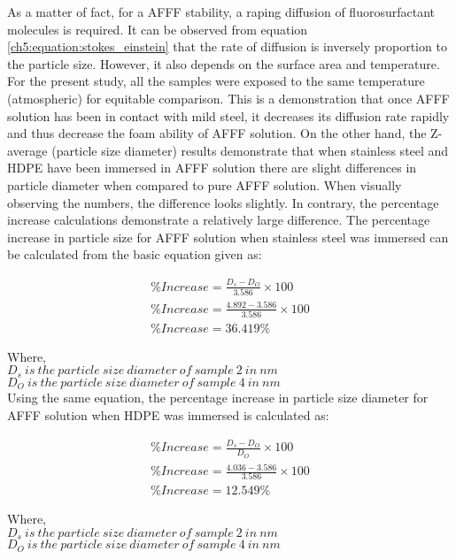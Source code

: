 As a matter of fact, for a AFFF stability, a raping diffusion of fluorosurfactant molecules is required. It can be observed from equation \ref{ch5:equation:stokes_einstein} that the rate of diffusion is inversely proportion to the particle size. However, it also depends on the surface area and temperature. For the present study, all the samples were exposed to the same temperature (atmospheric) for equitable comparison. This is a demonstration that once AFFF solution has been in contact with mild steel, it decreases its diffusion rate rapidly and thus decrease the foam ability of AFFF solution.  On the other hand, the Z-average (particle size diameter) results demonstrate that when stainless steel and HDPE have been immersed in AFFF solution there are slight differences in particle diameter when compared to pure AFFF solution. When visually observing the numbers, the difference looks slightly. In contrary, the percentage increase calculations demonstrate a relatively large difference. The percentage increase in particle size for AFFF solution when stainless steel was immersed can be calculated from the basic equation given as: 

\begin{gather}
    \%Increase = \frac{D_s - D_O}{3.586} \times 100 \\ 
    \nonumber \%Increase = \frac{4.892 - 3.586}{3.586}\times 100 \\
    \nonumber \%Increase = 36.419\%
    \label{ch5:equation:stainless_steel}
\end{gather}

Where, \\
$D_s\ is\ the\ particle\ size\ diameter\ of\ sample\ 2\ in\ nm$ \\
$D_O\ is\ the\ particle\ size\ diameter\ of\ sample\ 4\ in\ nm$ \\

Using the same equation, the percentage increase in particle size diameter for AFFF solution when HDPE was immersed is calculated as:  

\begin{gather}
    \%Increase = \frac{D_s - D_O}{D_O} \times 100 \\ 
    \nonumber \%Increase = \frac{4.036 - 3.586}{3.586}\times 100 \\
    \nonumber \%Increase = 12.549\% 
    \label{ch5:equation:hdpe}
\end{gather}
 
Where, \\
$D_s\ is\ the\ particle\ size\ diameter\ of\ sample\ 2\ in\ nm$ \\
$D_O\ is\ the\ particle\ size\ diameter\ of\ sample\ 4\ in\ nm$ \\

